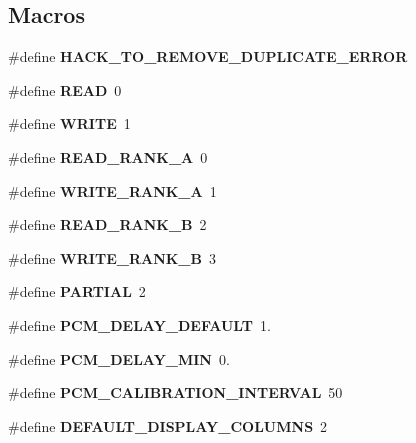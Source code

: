 \subsection*{Macros}
\begin{DoxyCompactItemize}
\item 
\#define {\bfseries H\+A\+C\+K\+\_\+\+T\+O\+\_\+\+R\+E\+M\+O\+V\+E\+\_\+\+D\+U\+P\+L\+I\+C\+A\+T\+E\+\_\+\+E\+R\+R\+OR}\label{pcm-memory_8cpp_ac4eeb11d89b0f517835a12a04443ebe4}

\item 
\#define {\bfseries R\+E\+AD}~0\label{pcm-memory_8cpp_ada74e7db007a68e763f20c17f2985356}

\item 
\#define {\bfseries W\+R\+I\+TE}~1\label{pcm-memory_8cpp_aa10f470e996d0f51210d24f442d25e1e}

\item 
\#define {\bfseries R\+E\+A\+D\+\_\+\+R\+A\+N\+K\+\_\+A}~0\label{pcm-memory_8cpp_a061436fedd2e4e9d6dd6166ee3a46038}

\item 
\#define {\bfseries W\+R\+I\+T\+E\+\_\+\+R\+A\+N\+K\+\_\+A}~1\label{pcm-memory_8cpp_a25115597a19f5bd3da468c407fbd0143}

\item 
\#define {\bfseries R\+E\+A\+D\+\_\+\+R\+A\+N\+K\+\_\+B}~2\label{pcm-memory_8cpp_a6d39da2a969f267aacc373b00ca94a36}

\item 
\#define {\bfseries W\+R\+I\+T\+E\+\_\+\+R\+A\+N\+K\+\_\+B}~3\label{pcm-memory_8cpp_a6cc2ce24b2b565d91979af011a711b0a}

\item 
\#define {\bfseries P\+A\+R\+T\+I\+AL}~2\label{pcm-memory_8cpp_abf4b6a83d9763fc6ae16c3e15dcf7a5b}

\item 
\#define {\bfseries P\+C\+M\+\_\+\+D\+E\+L\+A\+Y\+\_\+\+D\+E\+F\+A\+U\+LT}~1.\label{pcm-memory_8cpp_aa9ecc55c90c7a69729babc4f5f91ed96}

\item 
\#define {\bfseries P\+C\+M\+\_\+\+D\+E\+L\+A\+Y\+\_\+\+M\+IN}~0.\label{pcm-memory_8cpp_acccbe8441d6dd75bdc949f5f0ee126c5}

\item 
\#define {\bfseries P\+C\+M\+\_\+\+C\+A\+L\+I\+B\+R\+A\+T\+I\+O\+N\+\_\+\+I\+N\+T\+E\+R\+V\+AL}~50\label{pcm-memory_8cpp_a433dde946b6713059756318598c9a6fe}

\item 
\#define {\bfseries D\+E\+F\+A\+U\+L\+T\+\_\+\+D\+I\+S\+P\+L\+A\+Y\+\_\+\+C\+O\+L\+U\+M\+NS}~2\label{pcm-memory_8cpp_ab5189406a4fa5221316460ceead91292}

\end{DoxyCompactItemize}
